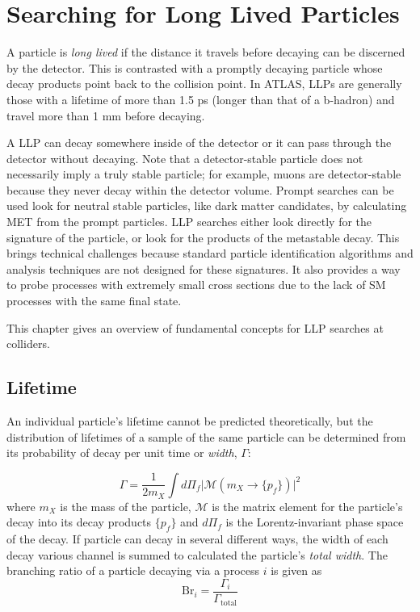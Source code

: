 \chapter{Searching for Long Lived Particles}
\label{chap:llps}

A particle is \emph{long lived} if the distance it travels before decaying can be discerned by the detector.  This is contrasted with a promptly decaying particle whose decay products point back to the collision point. In \ac{ATLAS}, \acp{LLP} are generally those with a lifetime of more than 1.5 ps (longer than that of a b-hadron) and travel more than 1 mm before decaying.

A \ac{LLP} can decay somewhere inside of the detector or it can pass through the detector without decaying. Note that a detector-stable particle does not necessarily imply a truly stable particle; for example, muons are detector-stable because they never decay within the detector volume. Prompt searches can be used look for neutral stable particles, like dark matter candidates, by calculating \ac{MET} from the prompt particles. \ac{LLP} searches either look directly for the signature of the particle, or look for the products of the metastable decay. This brings technical challenges because standard particle identification algorithms and analysis techniques are not designed for these signatures. It also provides a way to probe processes with extremely small cross sections due to the lack of \ac{SM} processes with the same final state.

This chapter gives an overview of fundamental concepts for \ac{LLP} searches at colliders.

\section{Lifetime}
An individual particle's lifetime cannot be predicted theoretically, but the distribution of lifetimes of a sample of the same particle can be determined from its probability of decay per unit time or \emph{width}, $\Gamma$:

\begin{equation}
\Gamma = \frac{1}{2m_{X}} \int d\Pi_f \big| \mathcal{M}(m_X \rightarrow \{p_f\})\big|^2
\end{equation}
where $m_X$ is the mass of the particle, $\mathcal{M}$ is the matrix element for the particle's decay into its decay products $\{p_f\}$ and $d\Pi_f$ is the Lorentz-invariant phase space of the decay.
If particle can decay in several different ways, the width of each decay various channel is summed to calculated the particle's \emph{total width}. The branching ratio of a particle decaying via a process $i$ is given as
\begin{equation}
\text{Br}_{i} = \frac{\Gamma_{i}}{\Gamma_{\text{total}}}
\end{equation}

